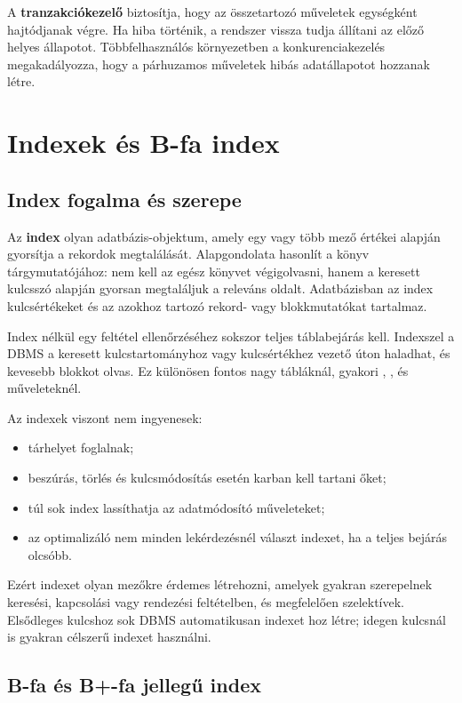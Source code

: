 A \textbf{tranzakciókezelő} biztosítja, hogy az összetartozó műveletek egységként hajtódjanak végre. Ha hiba történik, a rendszer vissza tudja állítani az előző helyes állapotot. Többfelhasználós környezetben a konkurenciakezelés megakadályozza, hogy a párhuzamos műveletek hibás adatállapotot hozzanak létre.

\section{Indexek és B-fa index}

\subsection{Index fogalma és szerepe}

Az \textbf{index} olyan adatbázis-objektum, amely egy vagy több mező értékei alapján gyorsítja a rekordok megtalálását. Alapgondolata hasonlít a könyv tárgymutatójához: nem kell az egész könyvet végigolvasni, hanem a keresett kulcsszó alapján gyorsan megtaláljuk a releváns oldalt. Adatbázisban az index kulcsértékeket és az azokhoz tartozó rekord- vagy blokkmutatókat tartalmaz.

Index nélkül egy feltétel ellenőrzéséhez sokszor teljes táblabejárás kell. Indexszel a DBMS a keresett kulcstartományhoz vagy kulcsértékhez vezető úton haladhat, és kevesebb blokkot olvas. Ez különösen fontos nagy tábláknál, gyakori , ,  és  műveleteknél.

Az indexek viszont nem ingyenesek:

\begin{itemize}
  \item tárhelyet foglalnak;
  \item beszúrás, törlés és kulcsmódosítás esetén karban kell tartani őket;
  \item túl sok index lassíthatja az adatmódosító műveleteket;
  \item az optimalizáló nem minden lekérdezésnél választ indexet, ha a teljes bejárás olcsóbb.
\end{itemize}

Ezért indexet olyan mezőkre érdemes létrehozni, amelyek gyakran szerepelnek keresési, kapcsolási vagy rendezési feltételben, és megfelelően szelektívek. Elsődleges kulcshoz sok DBMS automatikusan indexet hoz létre; idegen kulcsnál is gyakran célszerű indexet használni.

\subsection{B-fa és B+-fa jellegű index}

